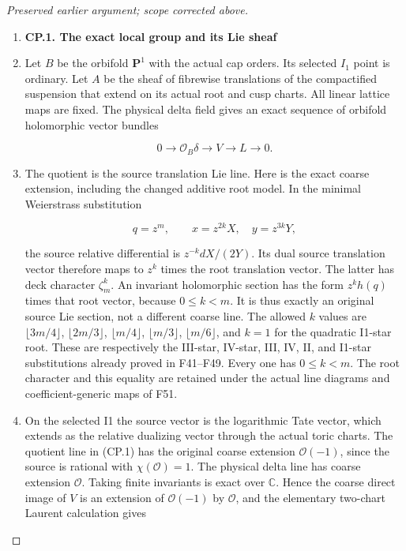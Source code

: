 \begin{proof}[Preserved earlier argument; scope corrected above]
\begin{enumerate}[label=\arabic*.]
\item \par

\medskip\noindent\textbf{CP.1. The exact local group and its Lie sheaf}

\par\nobreak

\item Let \(B\) be the orbifold \(\mathbf P^1\) with the actual cap orders. Its selected \(I_1\)
point is ordinary. Let \(A\) be the sheaf of fibrewise translations of the
compactified suspension that extend on its actual root and cusp charts.
All linear lattice maps are fixed. The physical delta field gives an
exact sequence of orbifold holomorphic vector bundles

\[
 0\longrightarrow\mathcal O_B\delta\longrightarrow V
       \longrightarrow L\longrightarrow0.                 \tag{CP.1}
\]

\item The quotient is the source translation Lie line. Here is the exact
coarse extension, including the changed additive root model. In the
minimal Weierstrass substitution

\[
 q=z^m,\qquad x=z^{2k}X,\quad y=z^{3k}Y,
\]

the source relative differential is \(z^{-k}dX/(2Y)\). Its dual source
translation vector therefore maps to \(z^k\) times the root translation
vector. The latter has deck character \(\zeta_m^k\). An invariant holomorphic
section has the form \(z^k h(q)\) times that root vector, because \(0\leq k<m\).
It is thus exactly an original source Lie section, not a different
coarse line. The allowed \(k\) values are \(\lfloor3m/4\rfloor\), \(\lfloor2m/3\rfloor\),
\(\lfloor m/4\rfloor\), \(\lfloor m/3\rfloor\), \(\lfloor m/6\rfloor\), and \(k=1\) for the quadratic I1-star
root. These are respectively the III-star, IV-star, III, IV, II, and
I1-star substitutions already proved in F41--F49. Every one has
\(0\leq k<m\). The root character and this equality are retained under the
actual line diagrams and coefficient-generic maps of F51.

\item On the selected I1 the source vector is the logarithmic Tate vector,
which extends as the relative dualizing vector through the actual
toric charts. The quotient line in (CP.1) has the original coarse
extension \(\mathcal O(-1)\), since the source is rational with \(\chi(\mathcal O)=1\). The
physical delta line has coarse extension \(\mathcal O\). Taking finite invariants
is exact over \(\mathbb C\). Hence the coarse direct image of \(V\) is an extension
of \(\mathcal O(-1)\) by \(\mathcal O\), and the elementary two-chart Laurent calculation gives


\end{enumerate}
\end{proof}
